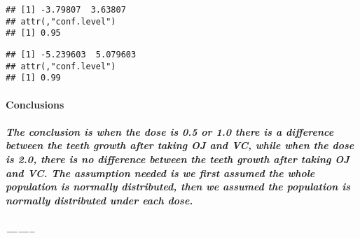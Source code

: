 \documentclass[
]{article}
\newenvironment{Shaded}{\begin{snugshade}}{\end{snugshade}}
\newcommand{\AttributeTok}[1]{\textcolor[rgb]{0.77,0.63,0.00}{#1}}
\newcommand{\CommentTok}[1]{\textcolor[rgb]{0.56,0.35,0.01}{\textit{#1}}}
\newcommand{\ConstantTok}[1]{\textcolor[rgb]{0.00,0.00,0.00}{#1}}
\newcommand{\FloatTok}[1]{\textcolor[rgb]{0.00,0.00,0.81}{#1}}
\newcommand{\FunctionTok}[1]{\textcolor[rgb]{0.00,0.00,0.00}{#1}}
\newcommand{\NormalTok}[1]{#1}
\newcommand{\SpecialCharTok}[1]{\textcolor[rgb]{0.00,0.00,0.00}{#1}}
\begin{document}
\begin{Shaded}
\end{Shaded}

\begin{verbatim}
## [1] -3.79807  3.63807
## attr(,"conf.level")
## [1] 0.95
\end{verbatim}

\begin{Shaded}
\end{Shaded}

\begin{verbatim}
## [1] -5.239603  5.079603
## attr(,"conf.level")
## [1] 0.99
\end{verbatim}

\hypertarget{conclusions}{%
\paragraph{Conclusions}\label{conclusions}}

\hypertarget{the-conclusion-is-when-the-dose-is-0.5-or-1.0-there-is-a-difference-between-the-teeth-growth-after-taking-oj-and-vc-while-when-the-dose-is-2.0-there-is-no-difference-between-the-teeth-growth-after-taking-oj-and-vc.-the-assumption-needed-is-we-first-assumed-the-whole-population-is-normally-distributed-then-we-assumed-the-population-is-normally-distributed-under-each-dose.}{%
\subparagraph{The conclusion is when the dose is 0.5 or 1.0 there is a
difference between the teeth growth after taking OJ and VC, while when
the dose is 2.0, there is no difference between the teeth growth after
taking OJ and VC. The assumption needed is we first assumed the whole
population is normally distributed, then we assumed the population is
normally distributed under each
dose.}\label{the-conclusion-is-when-the-dose-is-0.5-or-1.0-there-is-a-difference-between-the-teeth-growth-after-taking-oj-and-vc-while-when-the-dose-is-2.0-there-is-no-difference-between-the-teeth-growth-after-taking-oj-and-vc.-the-assumption-needed-is-we-first-assumed-the-whole-population-is-normally-distributed-then-we-assumed-the-population-is-normally-distributed-under-each-dose.}}

\hypertarget{section}{%
\subparagraph{--------}\label{section}}
\end{document}
